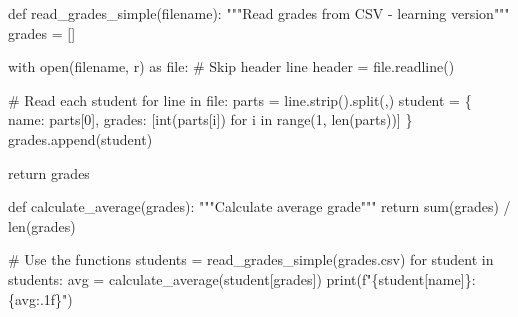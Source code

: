\documentclass[
  letterpaper,
  DIV=11,
  numbers=noendperiod,
  oneside]{scrreprt}
\newenvironment{Shaded}{}{}
\newcommand{\BuiltInTok}[1]{\textcolor[rgb]{0.84,0.23,0.29}{#1}}
\newcommand{\CommentTok}[1]{\textcolor[rgb]{0.42,0.45,0.49}{#1}}
\newcommand{\ControlFlowTok}[1]{\textcolor[rgb]{0.84,0.23,0.29}{#1}}
\newcommand{\DecValTok}[1]{\textcolor[rgb]{0.00,0.36,0.77}{#1}}
\newcommand{\ImportTok}[1]{\textcolor[rgb]{0.01,0.18,0.38}{#1}}
\newcommand{\KeywordTok}[1]{\textcolor[rgb]{0.84,0.23,0.29}{#1}}
\newcommand{\NormalTok}[1]{\textcolor[rgb]{0.14,0.16,0.18}{#1}}
\newcommand{\OperatorTok}[1]{\textcolor[rgb]{0.14,0.16,0.18}{#1}}
\newcommand{\SpecialCharTok}[1]{\textcolor[rgb]{0.00,0.36,0.77}{#1}}
\newcommand{\SpecialStringTok}[1]{\textcolor[rgb]{0.01,0.18,0.38}{#1}}
\newcommand{\StringTok}[1]{\textcolor[rgb]{0.01,0.18,0.38}{#1}}
\begin{document}
\begin{Shaded}
\begin{Highlighting}[]
\KeywordTok{def}\NormalTok{ read\_grades\_simple(filename):}
    \CommentTok{"""Read grades from CSV {-} learning version"""}
\NormalTok{    grades }\OperatorTok{=}\NormalTok{ []}
    
    \ControlFlowTok{with} \BuiltInTok{open}\NormalTok{(filename, }\StringTok{\textquotesingle{}r\textquotesingle{}}\NormalTok{) }\ImportTok{as} \BuiltInTok{file}\NormalTok{:}
        \CommentTok{\# Skip header line}
\NormalTok{        header }\OperatorTok{=} \BuiltInTok{file}\NormalTok{.readline()}
        
        \CommentTok{\# Read each student}
        \ControlFlowTok{for}\NormalTok{ line }\KeywordTok{in} \BuiltInTok{file}\NormalTok{:}
\NormalTok{            parts }\OperatorTok{=}\NormalTok{ line.strip().split(}\StringTok{\textquotesingle{},\textquotesingle{}}\NormalTok{)}
\NormalTok{            student }\OperatorTok{=}\NormalTok{ \{}
                \StringTok{\textquotesingle{}name\textquotesingle{}}\NormalTok{: parts[}\DecValTok{0}\NormalTok{],}
                \StringTok{\textquotesingle{}grades\textquotesingle{}}\NormalTok{: [}\BuiltInTok{int}\NormalTok{(parts[i]) }\ControlFlowTok{for}\NormalTok{ i }\KeywordTok{in} \BuiltInTok{range}\NormalTok{(}\DecValTok{1}\NormalTok{, }\BuiltInTok{len}\NormalTok{(parts))]}
\NormalTok{            \}}
\NormalTok{            grades.append(student)}
    
    \ControlFlowTok{return}\NormalTok{ grades}

\KeywordTok{def}\NormalTok{ calculate\_average(grades):}
    \CommentTok{"""Calculate average grade"""}
    \ControlFlowTok{return} \BuiltInTok{sum}\NormalTok{(grades) }\OperatorTok{/} \BuiltInTok{len}\NormalTok{(grades)}

\CommentTok{\# Use the functions}
\NormalTok{students }\OperatorTok{=}\NormalTok{ read\_grades\_simple(}\StringTok{\textquotesingle{}grades.csv\textquotesingle{}}\NormalTok{)}
\ControlFlowTok{for}\NormalTok{ student }\KeywordTok{in}\NormalTok{ students:}
\NormalTok{    avg }\OperatorTok{=}\NormalTok{ calculate\_average(student[}\StringTok{\textquotesingle{}grades\textquotesingle{}}\NormalTok{])}
    \BuiltInTok{print}\NormalTok{(}\SpecialStringTok{f"}\SpecialCharTok{\{}\NormalTok{student[}\StringTok{\textquotesingle{}name\textquotesingle{}}\NormalTok{]}\SpecialCharTok{\}}\SpecialStringTok{: }\SpecialCharTok{\{}\NormalTok{avg}\SpecialCharTok{:.1f\}}\SpecialStringTok{"}\NormalTok{)}
\end{Highlighting}
\end{Shaded}
\end{document}
